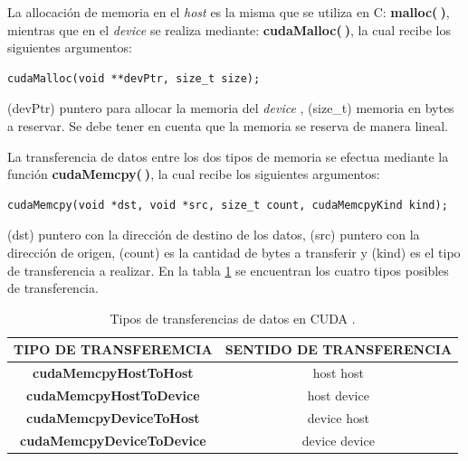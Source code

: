 La allocación de memoria en el \textit{host} es la misma que se utiliza en C: \textbf{malloc($\>$)}, mientras que en el \textit{device} se realiza mediante: \textbf{cudaMalloc($\>$)}, la cual recibe los siguientes argumentos:
{\footnotesize
\begin{frame}{}
	\begin{lstlisting}
cudaMalloc(void **devPtr, size_t size);
	\end{lstlisting}

\end{frame}
}
(devPtr) puntero para allocar la memoria del \textit{device} , (size\_t) memoria en bytes a reservar. Se debe tener en cuenta que la memoria se reserva de manera lineal.

La transferencia de datos entre los dos tipos de memoria se efectua mediante la función \textbf{cudaMemcpy($\>$)}, la cual recibe los siguientes argumentos:
{\footnotesize
\begin{frame}{}
	\begin{lstlisting}
cudaMemcpy(void *dst, void *src, size_t count, cudaMemcpyKind kind);
	\end{lstlisting}
	
\end{frame}
}
(dst) puntero con la dirección de destino de los datos, (src) puntero con la dirección de origen, (count) es la cantidad de bytes a transferir y (kind) es el tipo de transferencia a realizar\cite{zone2020cuda}. En la tabla \ref{tab:cudamemcy} se encuentran los cuatro tipos posibles de transferencia.

\begin{table}[h!]
	\centering
	\begin{tabular}{|c|c|}
		\hline
		\multicolumn{1}{|l|}{TIPO DE TRANSFEREMCIA} & \multicolumn{1}{l|}{SENTIDO DE TRANSFERENCIA} \\ \hline
		\textbf{cudaMemcpyHostToHost}               & host host                                     \\ \hline
		\textbf{cudaMemcpyHostToDevice}             & host device                                   \\ \hline
		\textbf{cudaMemcpyDeviceToHost}             & device host                                   \\ \hline
		\textbf{cudaMemcpyDeviceToDevice}           & device device                                 \\ \hline
	\end{tabular}
	\caption{Tipos de transferencias de datos en CUDA \cite{represa2016introduccion}.}
	\label{tab:cudamemcy}
\end{table}

